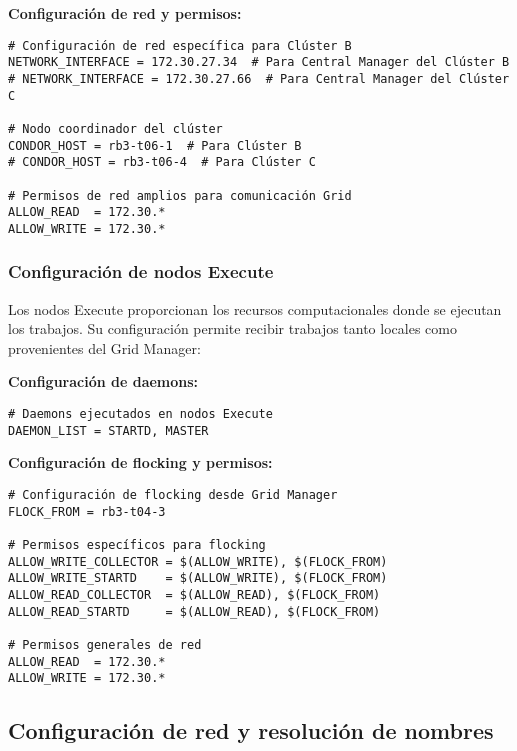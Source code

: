 \textbf{Configuración de red y permisos:}

\begin{verbatim}
# Configuración de red específica para Clúster B
NETWORK_INTERFACE = 172.30.27.34  # Para Central Manager del Clúster B
# NETWORK_INTERFACE = 172.30.27.66  # Para Central Manager del Clúster C

# Nodo coordinador del clúster
CONDOR_HOST = rb3-t06-1  # Para Clúster B
# CONDOR_HOST = rb3-t06-4  # Para Clúster C

# Permisos de red amplios para comunicación Grid
ALLOW_READ  = 172.30.*
ALLOW_WRITE = 172.30.*
\end{verbatim}

\FloatBarrier\subsubsection{Configuración de nodos Execute}

Los nodos Execute proporcionan los recursos computacionales donde se ejecutan los trabajos. Su configuración permite recibir trabajos tanto locales como provenientes del Grid Manager:

\textbf{Configuración de daemons:}

\begin{verbatim}
# Daemons ejecutados en nodos Execute
DAEMON_LIST = STARTD, MASTER
\end{verbatim}

\textbf{Configuración de flocking y permisos:}

\begin{verbatim}
# Configuración de flocking desde Grid Manager
FLOCK_FROM = rb3-t04-3

# Permisos específicos para flocking
ALLOW_WRITE_COLLECTOR = $(ALLOW_WRITE), $(FLOCK_FROM)
ALLOW_WRITE_STARTD    = $(ALLOW_WRITE), $(FLOCK_FROM)
ALLOW_READ_COLLECTOR  = $(ALLOW_READ), $(FLOCK_FROM)
ALLOW_READ_STARTD     = $(ALLOW_READ), $(FLOCK_FROM)

# Permisos generales de red
ALLOW_READ  = 172.30.*
ALLOW_WRITE = 172.30.*
\end{verbatim}

\FloatBarrier\subsection{Configuración de red y resolución de nombres}


